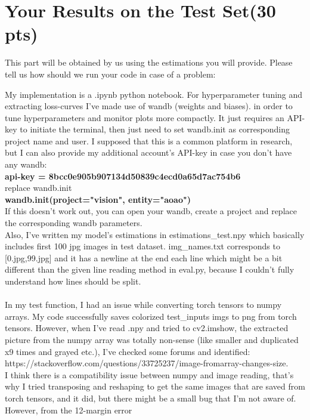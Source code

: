 \documentclass[12pt]{article}
\begin{document}
\section{Your Results on the Test Set(30 pts)}
This part will be obtained by us using the estimations you will provide. Please tell us how should we run your code in case of a problem:

\begin{center}
\raggedright
My implementation is a .ipynb python notebook. For hyperparameter tuning and extracting loss-curves I've made use of wandb (weights and biases).
in order to tune hyperparameters and monitor plots more compactly. It just requires an API-key to initiate the terminal, then just need to set 
wandb.init as corresponding project name and user. I supposed that this is a common platform in research, but I can also provide my additional account's API-key in case
you don't have any wandb: \\
\textbf{api-key = 8bcc0e905b907134d50839c4ecd0a65d7ac754b6} \\ 
replace wandb.init \\
\textbf{wandb.init(project="vision", entity="aoao")} \\
If this doesn't work out, you can open your wandb, create a project and replace the corresponding wandb parameters.
\\
Also, I've written my model's estimations in estimations\_test.npy which basically includes first 100 jpg images in test dataset.
img\_names.txt corresponds to [0.jpg,99.jpg] and it has a newline at the end each line which might be a bit different than the given line reading method in eval.py,
because I couldn't fully understand how lines should be split.
\\~\\
In my test function, I had an issue while converting torch tensors to numpy arrays. My code successfully saves colorized test\_inputs imgs
to png from torch tensors. However, when I've read .npy and tried to cv2.imshow, the extracted picture from the numpy array was totally non-sense
(like smaller and duplicated x9 times and grayed etc.), 
I've checked some forums and identified: https://stackoverflow.com/questions/33725237/image-fromarray-changes-size. \\
I think there is a compatibility issue between numpy and image reading, that's why 
I tried transposing and reshaping to get the same images that are saved from torch tensors, and it did,
but there might be a small bug that I'm not aware of. However, from the 12-margin error

\end{center}
\end{document}
